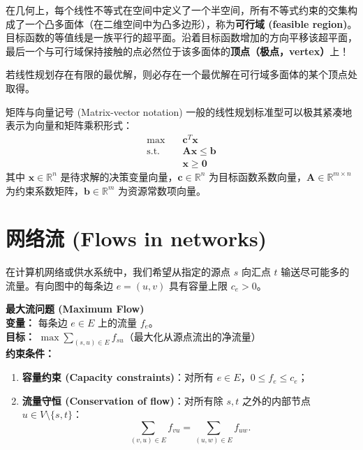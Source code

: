在几何上，每个线性不等式在空间中定义了一个半空间，所有不等式约束的交集构成了一个凸多面体（在二维空间中为凸多边形），称为\textbf{可行域 (feasible region)}。目标函数的等值线是一族平行的超平面。沿着目标函数增加的方向平移该超平面，最后一个与可行域保持接触的点必然位于该多面体的\textbf{顶点（极点，vertex）}上！

\begin{property}
若线性规划存在有限的最优解，则必存在一个最优解在可行域多面体的某个顶点处取得。
\end{property}

\begin{sidebarbox}{矩阵与向量记号 (Matrix-vector notation)}
一般的线性规划标准型可以极其紧凑地表示为向量和矩阵乘积形式：
\begin{align*}
\max \quad & \bm{c}^T \bm{x} \\
\text{s.t.} \quad & \bm{A}\bm{x} \le \bm{b} \\
& \bm{x} \ge \bm{0}
\end{align*}
其中 $\bm{x} \in \mathbb{R}^n$ 是待求解的决策变量向量，$\bm{c} \in \mathbb{R}^n$ 为目标函数系数向量，$\bm{A} \in \mathbb{R}^{m \times n}$ 为约束系数矩阵，$\bm{b} \in \mathbb{R}^m$ 为资源常数项向量。
\end{sidebarbox}

\section{网络流 (Flows in networks)}

在计算机网络或供水系统中，我们希望从指定的源点 $s$ 向汇点 $t$ 输送尽可能多的流量。有向图中的每条边 $e = (u, v)$ 具有容量上限 $c_e > 0$。

\begin{tcolorbox}[colback=white,colframe=gray!50!black]
\textbf{最大流问题 (Maximum Flow)} \\
\textbf{变量：} 每条边 $e \in E$ 上的流量 $f_e$。 \\
\textbf{目标：} $\max \sum_{(s, u) \in E} f_{su}$（最大化从源点流出的净流量） \\
\textbf{约束条件：}
\begin{enumerate}
    \item \textbf{容量约束 (Capacity constraints)}：对所有 $e \in E$，$0 \le f_e \le c_e$；
    \item \textbf{流量守恒 (Conservation of flow)}：对所有除 $s, t$ 之外的内部节点 $u \in V \setminus \{s, t\}$：
    \[
    \sum_{(v, u) \in E} f_{vu} = \sum_{(u, w) \in E} f_{uw}.
    \]
\end{enumerate}
\end{tcolorbox}

